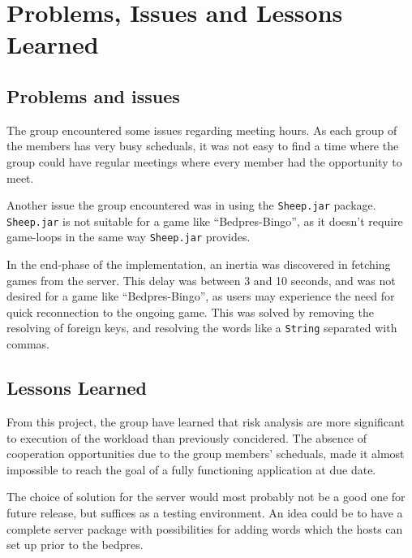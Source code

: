 \section{Problems, Issues and Lessons Learned}
\label{sec:issues}

\subsection{Problems and issues}
The group encountered some issues regarding meeting hours. As each group
of the members has very busy scheduals, it was not easy to find a time
where the group could have regular meetings where every member
had the opportunity to meet.

Another issue the group encountered
was in using the \texttt{Sheep.jar} package. \texttt{Sheep.jar} is not
suitable for a game like ``Bedpres-Bingo'', as it doesn't require game-loops in the same way \texttt{Sheep.jar} provides.

In the end-phase of the implementation, an inertia was discovered in
fetching games from the server. This delay was between 3 and 10 seconds,
and was not desired for a game like ``Bedpres-Bingo'', as users may
experience the need for quick reconnection to the ongoing game. This
was solved by removing the resolving of foreign keys, and resolving
the words like a \texttt{String} separated with commas.

\subsection{Lessons Learned}
From this project, the group have learned that risk analysis are more
significant to execution of the workload than previously concidered.
The absence of cooperation opportunities due to the group members' scheduals,
made it almost impossible to reach the goal of a fully functioning application
at due date.

The choice of solution for the server would most probably not be a good
one for future release, but suffices as a testing environment. An idea
could be to have a complete server package with possibilities for adding
words which the hosts can set up prior to the bedpres.